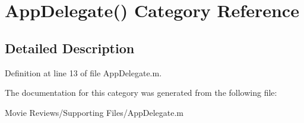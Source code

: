 \section{App\+Delegate() Category Reference}
\label{category_app_delegate_07_08}


\subsection{Detailed Description}


Definition at line 13 of file App\+Delegate.\+m.



The documentation for this category was generated from the following file\+:\begin{DoxyCompactItemize}
\item 
Movie Reviews/\+Supporting Files/App\+Delegate.\+m\end{DoxyCompactItemize}
